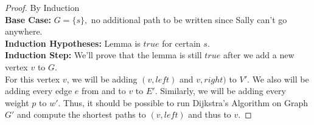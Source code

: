 \documentclass{article}
\theoremstyle{definition}
\theoremstyle{remark}
\theoremstyle{plain}
\begin{document}
\begin{proof} By Induction\\
\textbf{Base Case:} $G = \{ s \},$ no additional path to be written since Sally can't go anywhere.\\
\textbf{Induction Hypotheses:} Lemma is $true$ for certain $s$.\\
\textbf{Induction Step:} We'll prove that the lemma is still $true$ after we add a new vertex $v$ to $G$.\\
For this vertex $v$, we will be adding $(v, left)$ and $v, right)$ to $V'$. We also will be adding every edge $e$ from and to $v$ to $E'$. Similarly, we will be adding every weight $p$ to $w'$. 
Thus, it should be possible to run Dijkstra's Algorithm on Graph $G'$ and compute the shortest paths to $(v, left)$ and thus to $v$.
\end{proof}
\end{document}
